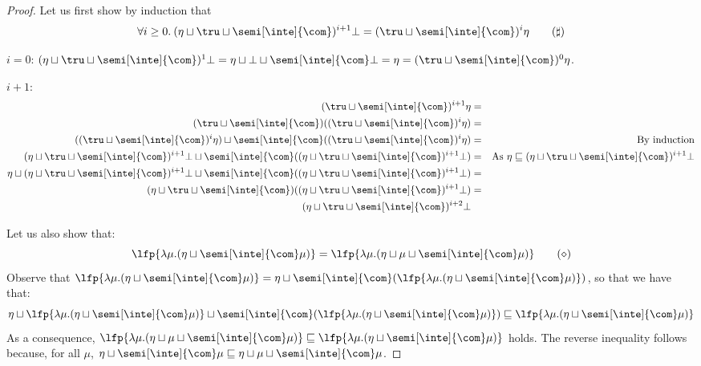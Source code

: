\begin{proof}
  Let us first show by induction that 
  \begin{equation}\label{prop2}
    \forall i\geq 0.\: (\eta \sqcup \tru \sqcup \semi[\inte]{\com})^{i+1} \bot = (\tru \sqcup \semi[\inte]{\com})^{i} \eta \tag{\(\sharp\)}
  \end{equation}

  \noindent
  \(i=0\): \( (\eta \sqcup \tru \sqcup \semi[\inte]{\com})^{1} \bot = \eta \sqcup \bot \sqcup \semi[\inte]{\com}\bot = \eta = 
  (\tru \sqcup \semi[\inte]{\com})^{0} \eta\).
  
  \noindent
  \(i+1\):  
  \begin{align*}
    (\tru \sqcup \semi[\inte]{\com})^{i+1} \eta & = & \\
    (\tru \sqcup \semi[\inte]{\com})((\tru \sqcup \semi[\inte]{\com})^{i} \eta) & = & \\
    ((\tru \sqcup \semi[\inte]{\com})^{i} \eta) \sqcup  \semi[\inte]{\com}((\tru \sqcup \semi[\inte]{\com})^{i} \eta) & = & \text{By induction}\\
    (\eta \sqcup \tru \sqcup \semi[\inte]{\com})^{i+1} \bot \sqcup \semi[\inte]{\com}((\eta \sqcup \tru \sqcup \semi[\inte]{\com})^{i+1}\bot ) &= & \text{As } \eta \sqsubseteq (\eta \sqcup \tru \sqcup \semi[\inte]{\com})^{i+1} \bot \\
    \eta \sqcup (\eta \sqcup \tru \sqcup \semi[\inte]{\com})^{i+1} \bot \sqcup \semi[\inte]{\com}((\eta \sqcup \tru \sqcup \semi[\inte]{\com})^{i+1}\bot ) & = & \\
    (\eta \sqcup \tru \sqcup \semi[\inte]{\com}) ((\eta \sqcup \tru \sqcup \semi[\inte]{\com})^{i+1} \bot) & = & \\
    (\eta \sqcup \tru \sqcup \semi[\inte]{\com})^{i+2} \bot & &
  \end{align*}

  Let us also show that:
  \begin{equation}\label{prop3}
    \lfp{\lambda \mu. (\eta \sqcup \semi[\inte]{\com} \mu)} =
    \lfp{\lambda \mu. (\eta \sqcup \mu \sqcup \semi[\inte]{\com} \mu)}\tag{\(\diamond\)}
  \end{equation}
  Observe that \(\lfp{\lambda \mu. (\eta \sqcup \semi[\inte]{\com} \mu)} = \eta \sqcup  \semi[\inte]{\com}(\lfp{\lambda \mu. (\eta \sqcup \semi[\inte]{\com} \mu)})\), so that we have that:
  \[
  \eta \sqcup  \lfp{\lambda \mu. (\eta \sqcup \semi[\inte]{\com} \mu)} \sqcup \semi[\inte]{\com}(\lfp{\lambda \mu. (\eta \sqcup \semi[\inte]{\com} \mu)})
  \sqsubseteq \lfp{\lambda \mu. (\eta \sqcup \semi[\inte]{\com} \mu)}
  \]
  As a consequence, \(\lfp{\lambda \mu. (\eta \sqcup \mu \sqcup \semi[\inte]{\com} \mu)}\sqsubseteq \lfp{\lambda \mu. (\eta \sqcup \semi[\inte]{\com} \mu)}\) holds. The reverse inequality follows because, for all \(\mu\), 
  \(\eta \sqcup \semi[\inte]{\com} \mu \sqsubseteq \eta \sqcup \mu \sqcup \semi[\inte]{\com} \mu\).


\end{proof}

